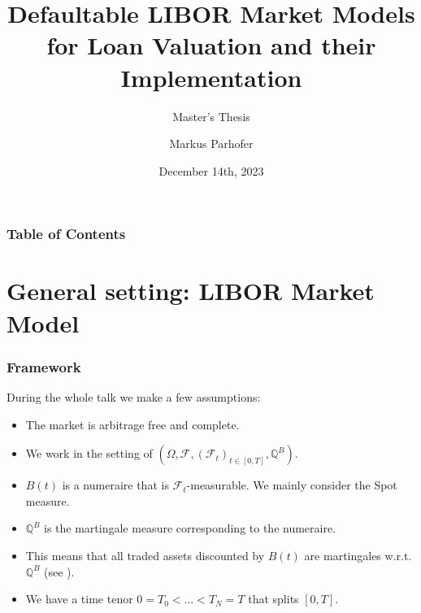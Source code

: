 \documentclass{beamer}
\title[Master's Seminar]
{Defaultable LIBOR Market Models for Loan Valuation and their Implementation}
\subtitle{Master's Thesis}
\author[M. Parhofer] %
{Markus Parhofer}
\institute[LMU] %
{
	Supervision:\\Prof. Dr. Christian Fries and Prof. Dr. Andrea Mazzon 
}
\date[December 14th, 2023] %
{December 14th, 2023}
\begin{document}
	
	\frame{\titlepage}
	
	\begin{frame}
		\frametitle{Table of Contents}
		\tableofcontents
	\end{frame}
	
	\section{General setting: LIBOR Market Model}\label{sectGeneral}
	
	\begin{frame}
		\frametitle{\nameref{sectGeneral}}
		\tableofcontents[ 
		currentsection, 
		sectionstyle=show/shaded, 
		subsectionstyle=show/shaded, 
		] 
	\end{frame}
	
	\begin{frame}
		\frametitle{Framework}
		
		During the whole talk we make a few assumptions:
		\begin{itemize}
			\item The market is arbitrage free and complete.
			\item We work in the setting of $(\Omega, \mathcal{F}, (\mathcal{F}_t)_{t\in \left[0,T\right]}, \mathbb{Q}^B)$.
			\item $B(t)$ is a numeraire that is $\mathcal{F}_t$-measurable. We mainly consider the Spot measure.
			\item $\mathbb{Q}^B$ is the martingale measure corresponding to the numeraire.
			\item This means that all traded assets discounted by $B(t)$ are martingales w.r.t. $\mathbb{Q}^B$ (see \cite{fima2Lecture}).
			\item We have a time tenor $0 = T_0 < ... < T_N = T$ that splits $[0,T]$.
		\end{itemize}
		
	\end{frame}
	
\end{document}
